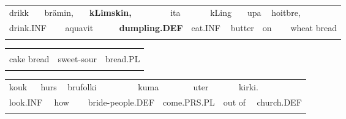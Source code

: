 \begin{tabular}{llllllllllllll}
\lsptoprule
drikk & \multicolumn{2}{l}{brämin,

} & \multicolumn{2}{l}{{\bfseries kLimskin,}

} & \multicolumn{2}{l}{ita

} & \multicolumn{2}{l}{kLing

} & \multicolumn{2}{l}{upa

} & \multicolumn{2}{l}{hoitbre,

} & \\
\multicolumn{2}{l}{drink.INF

} & \multicolumn{2}{l}{aquavit

} & \multicolumn{2}{l}{{\bfseries dumpling.DEF  }

} & \multicolumn{2}{l}{eat.INF

} & \multicolumn{2}{l}{butter

} & \multicolumn{2}{l}{on

} & \multicolumn{2}{l}{wheat bread

}\\
\lspbottomrule
\end{tabular}

\begin{tabular}{lll}
\lsptoprule
\multicolumn{3}{l}{kakubre,

}\\
cake bread & sweet-sour & bread.PL\\
\lspbottomrule
\end{tabular}

\begin{tabular}{llllllllllll}
\lsptoprule
kouk & \multicolumn{2}{l}{hurs

} & \multicolumn{2}{l}{brufolki

} & \multicolumn{2}{l}{kuma

} & \multicolumn{2}{l}{uter

} & \multicolumn{2}{l}{kirki.

} & \\
\multicolumn{2}{l}{look.INF

} & \multicolumn{2}{l}{how

} & \multicolumn{2}{l}{bride-people.DEF

} & \multicolumn{2}{l}{come.PRS.PL

} & \multicolumn{2}{l}{out of 

} & \multicolumn{2}{l}{church.DEF

}\\
\lspbottomrule
\end{tabular}

